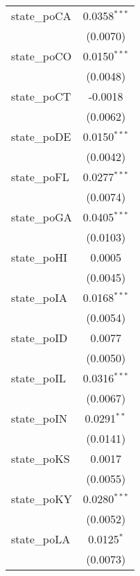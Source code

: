 \begin{tabular}{lc}
   state\_poCA                        & 0.0358$^{***}$\\   
                                      & (0.0070)\\   
   state\_poCO                        & 0.0150$^{***}$\\   
                                      & (0.0048)\\   
   state\_poCT                        & -0.0018\\   
                                      & (0.0062)\\   
   state\_poDE                        & 0.0150$^{***}$\\   
                                      & (0.0042)\\   
   state\_poFL                        & 0.0277$^{***}$\\   
                                      & (0.0074)\\   
   state\_poGA                        & 0.0405$^{***}$\\   
                                      & (0.0103)\\   
   state\_poHI                        & 0.0005\\   
                                      & (0.0045)\\   
   state\_poIA                        & 0.0168$^{***}$\\   
                                      & (0.0054)\\   
   state\_poID                        & 0.0077\\   
                                      & (0.0050)\\   
   state\_poIL                        & 0.0316$^{***}$\\   
                                      & (0.0067)\\   
   state\_poIN                        & 0.0291$^{**}$\\   
                                      & (0.0141)\\   
   state\_poKS                        & 0.0017\\   
                                      & (0.0055)\\   
   state\_poKY                        & 0.0280$^{***}$\\   
                                      & (0.0052)\\   
   state\_poLA                        & 0.0125$^{*}$\\   
                                      & (0.0073)\\   

\end{tabular}
